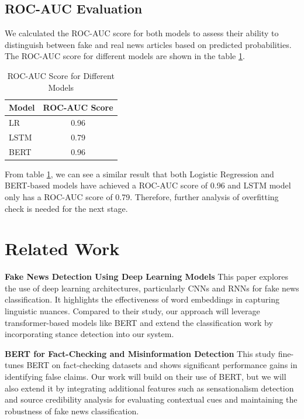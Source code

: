\documentclass[11pt,a4paper]{article}
\begin{document}
\subsection{ROC-AUC Evaluation}
We calculated the ROC-AUC score for both models to assess their ability to distinguish between fake and real news articles based on predicted probabilities. The ROC-AUC score for different models are shown in the table \ref{tab:roc_auc_score}.

\begin{table}[h]
    \centering
    \begin{tabular}{lc}
        \toprule
        Model & ROC-AUC Score \\
        \midrule
        LR & 0.96 \\
        LSTM & 0.79 \\
        BERT & 0.96 \\
        \bottomrule
    \end{tabular}
    \caption{ROC-AUC Score for Different Models}
    \label{tab:roc_auc_score}
\end{table}

From table \ref{tab:roc_auc_score}, we can see a similar result that both Logistic Regression and BERT-based models have achieved a ROC-AUC score of 0.96 and LSTM model only has a ROC-AUC score of 0.79. Therefore, further analysis of overfitting check is needed for the next stage.

\section{Related Work}

\textbf{Fake News Detection Using Deep Learning Models} \cite{hu2022deep}
This paper explores the use of deep learning architectures, particularly CNNs and RNNs for fake news classification. It highlights the effectiveness of word embeddings in capturing linguistic nuances. 
Compared to their study, our approach will leverage transformer-based models like BERT and extend the classification work by incorporating stance detection into our system.

\textbf{BERT for Fact-Checking and Misinformation Detection} \cite{anggrainingsih2025evaluating}
This study fine-tunes BERT on fact-checking datasets and shows significant performance gains in identifying false claims. 
Our work will build on their use of BERT, but we will also extend it by integrating additional features such as sensationalism detection and source credibility analysis for evaluating contextual cues and maintaining the robustness of fake news classification.
\end{document}
